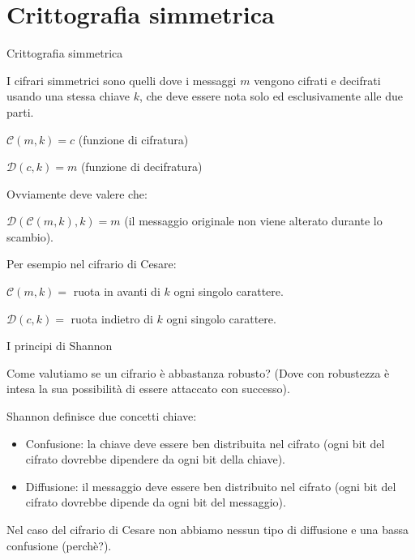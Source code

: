 \documentclass[xcolor=dvipsnames,aspectratio=169]{beamer}
\begin{document}
\part{Crittografia simmetrica}

\begin{frame}
	\partpage
	\centering
\end{frame}

\begin{frame}{Crittografia simmetrica}

  \pause

  I cifrari simmetrici sono quelli dove i messaggi $m$ vengono cifrati e decifrati usando una stessa chiave $k$, che deve essere nota solo ed esclusivamente alle due parti.
  
  \medskip

  \pause
  $\mathcal{C}(m, k) = c$ (funzione di cifratura)
    
  $\mathcal{D}(c, k) = m$ (funzione di decifratura)
  
  \medskip

  Ovviamente deve valere che:
  
  $\mathcal{D}(\mathcal{C}(m, k), k) = m$ (il messaggio originale non viene alterato durante lo scambio).
  
  \medskip
  \pause
  
  Per esempio nel cifrario di Cesare:
  
  $\mathcal{C}(m, k) = $ ruota in avanti di $k$ ogni singolo carattere.
  
  $\mathcal{D}(c, k) = $ ruota indietro di $k$ ogni singolo carattere.
  
\end{frame}

\begin{frame}{I principi di Shannon}

  \pause
  Come valutiamo se un cifrario è abbastanza robusto? (Dove con robustezza è intesa la sua possibilità di essere attaccato con successo). 
  
  \medskip
  \pause
  Shannon definisce due concetti chiave:
  
  \begin{itemize}
    \item Confusione: la chiave deve essere ben distribuita nel cifrato (ogni bit del cifrato dovrebbe dipendere da ogni bit della chiave).
    \item Diffusione: il messaggio deve essere ben distribuito nel cifrato (ogni bit del cifrato dovrebbe dipende da ogni bit del messaggio).
  \end{itemize}
  
  \medskip
  \pause
  
  Nel caso del cifrario di Cesare non abbiamo nessun tipo di diffusione e una bassa confusione (perchè?).
  
\end{frame}
\end{document}
